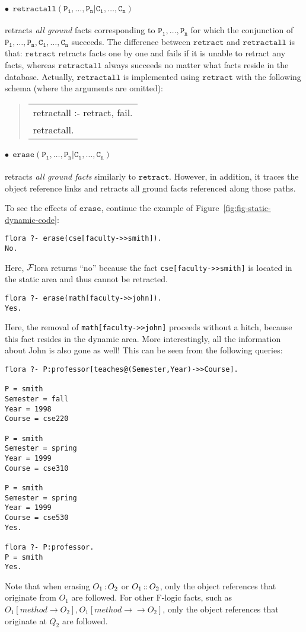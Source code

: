 \documentclass[11pt]{article}
\newenvironment{qrules}{\begin{quote}\sf\begin{tabular}[t]{l}}%
{\end{tabular}\end{quote}}
\newcommand{\isa}{\,{\bf{:}}\,}
\newcommand{\subcl}{\,{\bf{::}}\,}
\newcommand{\fd}{\ensuremath{{\rightarrow}}}                   %
\newcommand{\mvd}{\ensuremath{{\rightarrow\!\!\!\!\rightarrow}}}  %
\newcommand{\FLORA}{{\mbox{${\cal F}${\sc lora}}}\xspace}
\newcommand{\fl}{{F-logic}\xspace}
\begin{document}
\paragraph{$\bullet~~\mathtt{retractall(P_1,\ldots,P_n | C_1,\ldots,C_n)}$} retracts \emph{all ground}
facts corresponding to $\mathtt{P_1,\ldots,P_n}$ for which the conjunction
of $\mathtt{P_1,\ldots,P_n,C_1,\ldots,C_n}$ succeeds. The difference
between $\mathtt{retract}$ and $\mathtt{retractall}$ is that:
$\mathtt{retract}$ retracts facts one by one and fails if it is unable to
retract any facts, whereas $\mathtt{retractall}$ always succeeds no matter
what facts reside in the database. Actually, $\mathtt{retractall}$ is
implemented using $\mathtt{retract}$ with the following schema (where the
arguments are omitted):
\begin{qrules}
retractall :- retract, fail. \\
retractall.
\end{qrules}

\paragraph{$\bullet~~\mathtt{erase(P_1,\ldots,P_n | C_1,\ldots,C_n)}$}
retracts \emph{all ground facts} 
similarly to $\mathtt{retract}$. However, in addition, it traces the object
reference links and retracts all ground facts referenced along those paths.

To see the effects of $\mathtt{erase}$, continue
the example of Figure~\ref{fig:fig-static-dynamic-code}:
\begin{verbatim}
flora ?- erase(cse[faculty->>smith]).
No.
\end{verbatim}
Here, \FLORA returns ``no'' because the fact {\tt cse[faculty->>smith]} is
located in the static area and thus cannot be retracted.

\begin{verbatim}
flora ?- erase(math[faculty->>john]).
Yes.
\end{verbatim}
Here, the removal of {\tt math[faculty->>john]} proceeds without a hitch,
because this fact resides in the dynamic area. More interestingly, all the
information about John is also gone as well!
This can be seen from the following queries:
\begin{verbatim}
flora ?- P:professor[teaches@(Semester,Year)->>Course].

P = smith
Semester = fall
Year = 1998
Course = cse220

P = smith
Semester = spring
Year = 1999
Course = cse310

P = smith
Semester = spring
Year = 1999
Course = cse530
Yes.

flora ?- P:professor.
P = smith
Yes.
\end{verbatim}
Note that when erasing $O_1{\isa}O_2$ or $O_1{\subcl}O_2$, only the object
references that originate from $O_1$ are followed. For other \fl facts, such as
$O_1[method{\fd}O_2],O_1[method{\mvd}O_2]$, only the object references
that originate at $Q_2$ are followed.
\end{document}
